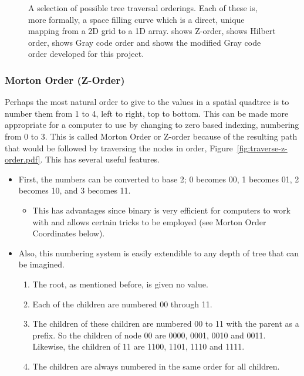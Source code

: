 \begin{figure}[tbh]
	\caption[A selection of possible tree traversal orderings]{A selection of
		possible tree traversal orderings. Each of these is, more formally, a
		space filling curve which is a direct, unique mapping from a 2D grid to
		a 1D array.  shows Z-order,
		 shows Hilbert order,
		 shows Gray code order and
		 shows the modified Gray code
		order developed for this project.}\label{fig:order_traversals}
\end{figure}

\subsubsection[Morton Order]{Morton Order (Z-Order)}
\label{ssub:morton_code_z_order_}

Perhaps the most natural order to give to the values in a spatial quadtree is
to number them from 1 to 4, left to right, top to bottom. This can be made more
appropriate for a computer to use by changing to zero based indexing,
numbering from 0 to 3. This is called Morton Order\cite{mortoncomputer} or
Z-order because of the resulting path that would be followed by traversing the
nodes in order, Figure~\ref{fig:traverse-z-order.pdf}. This has several useful
features.

\begin{itemize}
	\item First, the numbers can be converted to base 2; 0 becomes 00, 1
		becomes 01, 2 becomes 10, and 3 becomes 11.

		\begin{itemize}
			\item This has advantages since binary is very efficient for
				computers to work with and allows certain tricks to be employed
				(see Morton Order Coordinates below).
		\end{itemize}

	\item Also, this numbering system is easily extendible to any depth of
	tree that can be imagined.

	\begin{enumerate}

		\item The root, as mentioned before, is given no value.

		\item Each of the children are numbered {00} through 11.

		\item The children of these children are numbered 00 to 11 with the
			parent as a prefix. So the children of node 00 are 0000, 0001, 0010
			and 0011. Likewise, the children of 11 are 1100, 1101, 1110 and
			1111.

		\item The children are always numbered in the same order for all
			children.

	\end{enumerate}
\end{itemize}

